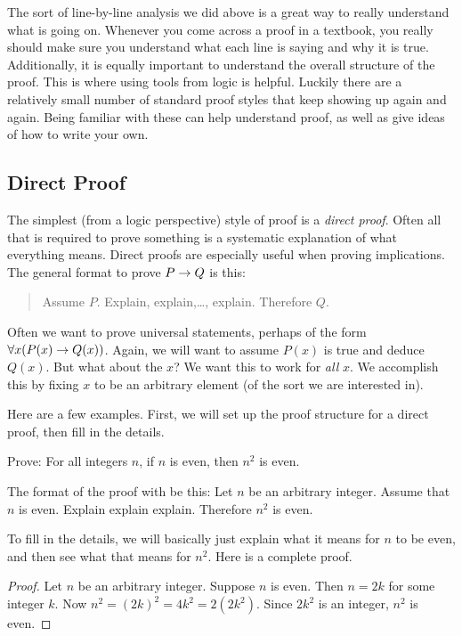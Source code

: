 \documentclass[12pt]{article}
\begin{document}
 The sort of line-by-line analysis we did above is a great way to really understand what is going on.  Whenever you come across a proof in a textbook, you really should make sure you understand what each line is saying and why it is true.  Additionally, it is equally important to understand the overall structure of the proof.  This is where using tools from logic is helpful.  Luckily there are a relatively small number of standard proof styles that keep showing up again and again.  Being familiar with these can help understand proof, as well as give ideas of how to write your own.

 \subsection*{Direct Proof}

 The simplest (from a logic perspective) style of proof is a {\em direct proof}.  Often all that is required to prove something is a systematic explanation of what everything means.  Direct proofs are especially useful when proving implications.  The general format to prove $P \rightarrow Q$ is this:

 \begin{quote}
 Assume $P$.  Explain, explain,\ldots, explain.  Therefore $Q$.
 \end{quote}

 Often we want to prove universal statements, perhaps of the form $\forall x (P(x) \rightarrow Q(x))$.  Again, we will want to assume $P(x)$ is true and deduce $Q(x)$.  But what about the $x$?  We want this to work for {\em all} $x$.  We accomplish this by fixing $x$ to be an arbitrary element (of the sort we are interested in).

 Here are a few examples.  First, we will set up the proof structure for a direct proof, then fill in the details.

 \begin{example}
 	Prove: For all integers $n$, if $n$ is even, then $n^2$ is even.

 	\begin{solution}
	 	The format of the proof with be this: Let $n$ be an arbitrary integer.  Assume that $n$ is even.  Explain explain explain.  Therefore $n^2$ is even.

	 	To fill in the details, we will basically just explain what it means for $n$ to be even, and then see what that means for $n^2$.  Here is a complete proof.

 	   \begin{proof}
 	     Let $n$ be an arbitrary integer.  Suppose $n$ is even.  Then $n = 2k$ for some integer $k$.  Now $n^2 = (2k)^2 = 4k^2 = 2(2k^2)$.  Since $2k^2$ is an integer, $n^2$ is even.
 	   \end{proof}
 	\end{solution}
 \end{example}
\end{document}
